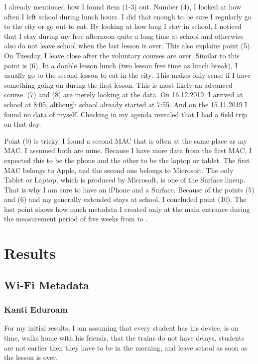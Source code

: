\documentclass[paper=a4, fontsize=11pt]{article}
\begin{document}
I already mentioned how I found item (1-3) out. Number (4), I looked at how often I left school during lunch hours. I did that enough to be sure I regularly go to the city or go out to eat.
By looking at how long I stay in school, I noticed that I stay during my free afternoon quite a long time at school and otherwise also do not leave school when the last lesson is over.
This also explains point (5). On Tuesday, I leave close after the voluntary courses are over.
Similar to this point is (6). In a double lesson lunch (two lesson free time as lunch break), I usually go to the second lesson to eat in the city. This makes only sense if I have something going on during the first lesson. This is most likely an advanced course.
(7) and (8) are merely looking at the data. On 16.12.2019, I arrived at school at 8:05, although school already started at 7:55. And on the 15.11.2019 I found no data of myself. Checking in my agenda revealed that I had a field trip on that day.

Point (9) is tricky. I found a second MAC that is often at the same place as my MAC. I assumed both are mine. Because I have more data from the first MAC, I expected this to be the phone and the other to be the laptop or tablet. The first MAC belongs to Apple, and the second one belongs to Microsoft. The only Tablet or Laptop, which is produced by Microsoft, is one of the Surface lineup. That is why I am sure to have an iPhone and a Surface.
Because of the points (5) and (6) and my generally extended stays at school, I concluded point (10).
The last point shows how much metadata I created only at the main entrance during the measurement period of five weeks from  to . 

\section{Results}

\subsection{ Wi-Fi Metadata}
\subsubsection{Kanti Eduroam}
For my initial results, I am assuming that every student has his device, is on time, walks home with his friends, that the trains do not have delays, students are not earlier then they have to be in the morning, and leave school as soon as the lesson is over.
\end{document}
